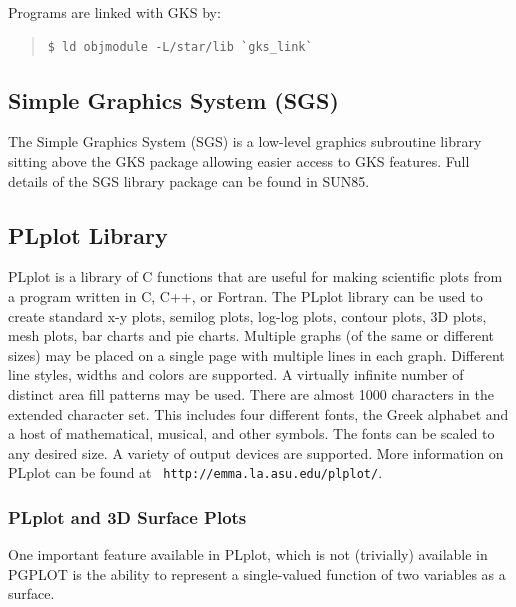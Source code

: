 \documentclass[twoside,11pt]{article}
\newcommand{\htmlref}[2]{#1}
\newcommand{\latex}[1]{#1}
\newcommand{\xref}[3]{#1}
\newcommand{\xlabel}[1]{}
\begin{document}
Programs are linked with GKS by: 

\small
\begin{quote}
\begin{verbatim}
$ ld objmodule -L/star/lib `gks_link` 
\end{verbatim}
\end{quote}
\normalsize

\subsection{\xlabel{sc15_sgs}Simple Graphics System (SGS)\label{sc15_sgs}}

The \xref{Simple Graphics System}{sun85}{} (SGS) is a low-level
graphics subroutine library sitting above the \htmlref{GKS}{sc15_gks}
package allowing easier access to GKS features. Full details of the
SGS library package can be found in \xref{SUN85}{sun85}{}.

\subsection{\xlabel{sc15_plplot}PLplot Library\label{sc15_plplot}}

PLplot is a library of C functions that are useful for making
scientific plots from a program written in C, C++, or Fortran. The
PLplot library can be used to create standard x-y plots, semilog
plots, log-log plots, contour plots, 3D plots, mesh plots, bar charts
and pie charts. Multiple graphs (of the same or different sizes) may
be placed on a single page with multiple lines in each graph.
Different line styles, widths and colors are supported. A virtually
infinite number of distinct area fill patterns may be used. There are
almost 1000 characters in the extended character set. This includes
four different fonts, the Greek alphabet and a host of mathematical,
musical, and other symbols. The fonts can be scaled to any desired
size. A variety of output devices are supported. \latex{More
information on PLplot can be found at {\tt
http://emma.la.asu.edu/plplot/}.}

\subsubsection{PLplot and 3D Surface Plots}

One important feature available in PLplot, which is not (trivially)
available in PGPLOT is the ability to represent a single-valued
function of two variables as a surface. 
\end{document}
